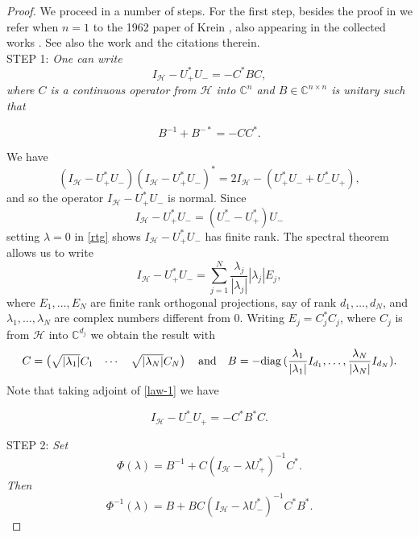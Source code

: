 \documentclass[12pt]{amsart}
\theoremstyle{definition}
\theoremstyle{remark}
\numberwithin{equation}{section}
\begin{document}
\begin{proof} We proceed in a number of steps. For the first step, besides the proof in \cite{MR1638044} we refer when $n=1$ to the 1962 paper of Krein \cite{krein-trace2},
  also appearing in the collected works \cite[p. 342]{MR1710394}. See also the work \cite{MR3861897} and the citations therein.\\

  STEP 1: {\sl One can write
  \begin{equation}
    I_{\mathcal H}-U_+^*U_-=-C^*BC,
\label{law-1}
  \end{equation}
  where $C$ is a continuous operator from $\mathcal H$ into $\mathbb C^n$ and $B\in\mathbb C^{n\times n}$ is unitary such that}

  \begin{equation}
    \label{bbcc}
    B^{-1}+B^{-*}=-CC^*.
    \end{equation}

    We have
    \[
      (I_{\mathcal H}-U_+^*U_-)  (I_{\mathcal H}-U_+^*U_-)^*=2I_{\mathcal H}-(U_+^*U_-+U_-^*U_+),
    \]
    and so the operator $I_{\mathcal H}-U_+^*U_-$ is normal. Since
    \[
I_{\mathcal H}-U_+^*U_-=(U_-^*-U_+^*)U_-
\]
setting $\lambda=0$ in \eqref{rtg} shows  $I_{\mathcal H}-U_+^*U_-$  has finite rank. The spectral theorem allows us to write
    \[
I_{\mathcal H}-U_+^*U_-=\sum_{j=1}^N \frac{\lambda_j}{|\lambda_j|}|\lambda_j|E_j,
    \]
    where $E_1,\ldots, E_N$ are finite rank orthogonal projections, say of rank $d_1,\ldots, d_N$, and $\lambda_1,\ldots, \lambda_N$ are complex numbers different from
    $0$. Writing $E_j=C_j^*C_j$, where $C_j$ is from $\mathcal H$ into $\mathbb C^{d_j}$ we obtain the result with
\[
C=\begin{pmatrix}\sqrt{|\lambda_1|}C_1&\cdots &\sqrt{|\lambda_N|}C_N\end{pmatrix}\quad{\rm and}\quad
B=-{\rm diag}\, (\frac{\lambda_1}{|\lambda_1|}I_{d_1},\ldots, \frac{\lambda_N}{|\lambda_N|}I_{d_N}).
  \]
Note that taking adjoint of \eqref{law-1} we have

  \begin{equation}
    I_{\mathcal H}-U_-^*U_+=-C^*B^*C .
\label{law-2}
  \end{equation}

STEP 2: {\sl Set
  \begin{equation}
    \label{phi-model}
    \Phi(\lambda)=B^{-1}+C(I_{\mathcal H}-\lambda U_+^*)^{-1}C^*.
  \end{equation}
  Then}
    \begin{equation}
      \Phi^{-1}(\lambda)=B+BC(I_{\mathcal H}-\lambda U_-^*)^{-1}C^*B^*.
\label{inv-inv}
    \end{equation}


\end{proof}
\end{document}

